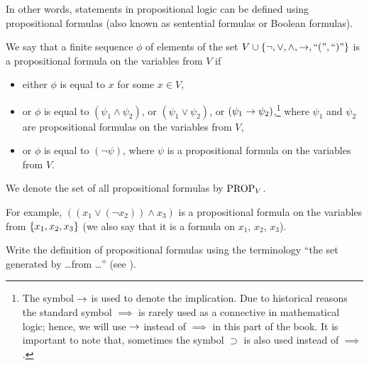 In other words, statements in propositional logic can be defined using
propositional formulas (also known as sentential formulas or Boolean formulas).
\begin{definition}
  We say that a finite sequence $\phi$ of elements of the set
  $V \cup \set{\lnot, \lor, \land, \limplies, \text{``(''}, \text{``)''}}$
  is a propositional formula on the variables from $V$ if
  \begin{itemize}
    \item either $\phi$ is equal to $x$ for some $x \in V$,
    \item or $\phi$ is equal to $(\psi_1 \land \psi_2)$, or
      $(\psi_1 \lor \psi_2)$, or $(\psi_1 \rightarrow \psi_2)$,\footnote{%
        The symbol $\rightarrow$ is used to denote the implication.
        Due to historical reasons the standard symbol $\implies$ is rarely
        used as a connective in mathematical logic; hence, we will use
        $\rightarrow$ instead of $\implies$ in this part of the book.
        It is important to note that, sometimes the symbol $\supset$ is also
        used instead of $\implies$.
      }
      where $\psi_1$ and $\psi_2$ are propositional formulas on the variables
      from $V$,
    \item or $\phi$ is equal to $(\lnot \psi)$, where $\psi$ is a propositional
      formula on the variables from $V$.
  \end{itemize}

  We denote the set of all propositional formulas by $\mathrm{PROP}_{V}$.
\end{definition}

For example, $((x_1 \lor (\lnot x_2)) \land x_3)$ is a propositional formula on
the variables from $\set{x_1, x_2, x_3}$ (we also say that it is a formula on
$x_1$, $x_2$, $x_3$).

\begin{exercise}
  Write the definition of propositional formulas using the terminology
  ``the set generated by \dots from \dots'' (see ).
\end{exercise}

